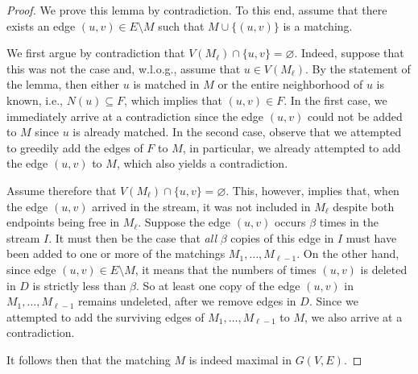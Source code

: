 \documentclass[11pt,a4paper]{article}
\begin{document}
\begin{proof}
    We prove this lemma by contradiction. To this end, assume that there exists an edge $(u,v) \in E \setminus M$ such that $M \cup \{ (u, v) \}$ is a matching. 
    
    We first argue by contradiction that $V(M_{\ell}) \cap \{u,v\} = \varnothing$. Indeed, suppose that this was not the case and, w.l.o.g., assume that $u \in V(M_{\ell})$. By the statement of the lemma, then either $u$ is matched in $M$ or the entire neighborhood of $u$ is known, i.e., $N(u) \subseteq F$, which implies that $(u, v) \in F$. In the first case, we immediately arrive at a contradiction since the edge $(u,v)$ could not be added to $M$ since $u$ is already matched. In the second case, observe that we attempted to greedily add the edges of $F$ to $M$, in particular, we already attempted to add the edge $(u,v)$ to $M$, which also yields a contradiction.

    Assume therefore that $V(M_{\ell}) \cap \{u,v\} = \varnothing$. This, however, implies that, when the edge $(u,v)$ arrived in the stream, it was not included in $M_{\ell}$ despite both endpoints being free in $M_{\ell}$. Suppose the edge $(u,v)$ occurs $\beta$ times in the stream $I$. It must then be the case that {\em all} $\beta$ copies of this edge in $I$ must have been added to one or more of the matchings $M_1, \dots, M_{\ell-1}$. On the other hand, since edge $(u,v) \in E \setminus M$, it means that the numbers of times $(u,v)$ is deleted in $D$ is strictly less than $\beta$. So at least one copy of the edge $(u,v)$ in $M_1, \dots, M_{\ell-1}$ remains undeleted, after we remove edges in $D$. Since we attempted to add the surviving edges of $M_1, \dots, M_{\ell-1}$ to $M$, we also arrive at a contradiction. 

   It follows then that the matching $M$ is indeed maximal in $G(V,E)$.

    


\end{proof}
\end{document}
